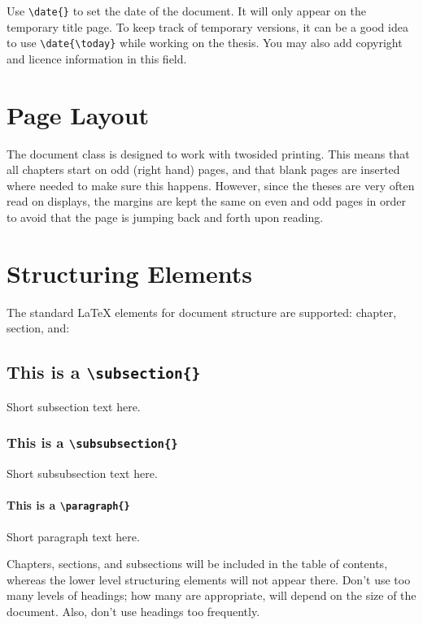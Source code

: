 Use \texttt{\textbackslash date\{\}} to set the date of the document. It will only  appear on the temporary title page. To keep track of temporary versions, it can be a good idea to use \texttt{\textbackslash date\{\textbackslash today\}} while working on the thesis. You may also add copyright and licence information in this field.

\section{Page Layout}

The document class is designed to work with twosided printing. This means that all chapters start on odd (right hand) pages, and that blank pages are inserted where needed to make sure this happens. However, since the theses are very often read on displays, the margins are kept the same on even and odd pages in order to avoid that the page is jumping back and forth upon reading.

\section{Structuring Elements}

The standard \LaTeX{} elements for document structure are supported: chapter, section, and:

\subsection{This is a \texttt{\textbackslash subsection\{\}}}

Short subsection text here.

\subsubsection{This is a \texttt{\textbackslash subsubsection\{\}}}

Short subsubsection text here. 

\paragraph{This is a \texttt{\textbackslash paragraph\{\}}}

Short paragraph text here.

Chapters, sections, and subsections will be included in the table of contents, whereas the lower level structuring elements will not appear there. Don't use too many levels of headings; how many are appropriate, will depend on the size of the document. Also, don't use headings too frequently.

